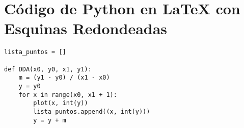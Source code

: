 \documentclass{article}
\begin{document}
\section{Código de Python en LaTeX con Esquinas Redondeadas}

\begin{lstlisting}
lista_puntos = []

def DDA(x0, y0, x1, y1):
    m = (y1 - y0) / (x1 - x0)
    y = y0
    for x in range(x0, x1 + 1):
        plot(x, int(y))
        lista_puntos.append((x, int(y)))
        y = y + m
\end{lstlisting}
\end{document}
